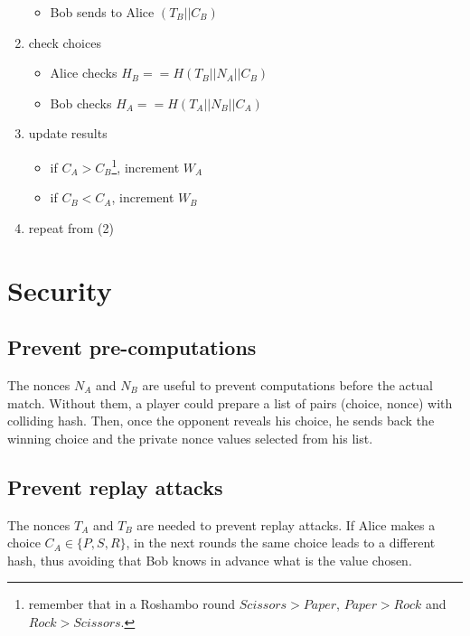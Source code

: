 \documentclass[11 pt]{article}
\begin{document}
\begin{enumerate}
\begin{itemize}
		\item Bob sends to Alice $(T_B || C_B)$
	\end{itemize}
	\item check choices
	\begin{itemize}
		\item Alice checks $H_B == H( T_B || N_A || C_B )$
		\item Bob checks $H_A == H( T_A || N_B || C_A )$
	\end{itemize}
	\item update results
	\begin{itemize}
		\item if $C_A > C_B$\footnote{remember that in a Roshambo round $Scissors > Paper$, $Paper > Rock$ and $Rock > Scissors$.}, increment $W_A$
		\item if $C_B < C_A$, increment $W_B$
	\end{itemize}
	\item repeat from (2)
\end{enumerate}



\section{Security}
\subsection{Prevent pre-computations}
The nonces $N_A$ and $N_B$ are useful to prevent computations before the actual match. Without them, a player could prepare a list of pairs (choice, nonce) with colliding hash. Then, once the opponent reveals his choice, he sends back the winning choice and the private nonce values selected from his list.

\subsection{Prevent replay attacks}
The nonces $T_A$ and $T_B$ are needed to prevent replay attacks. If Alice makes a choice $C_A \in \{P, S, R\}$, in the next rounds the same choice leads to a different hash, thus avoiding that Bob knows in advance what is the value chosen.
\end{document}

